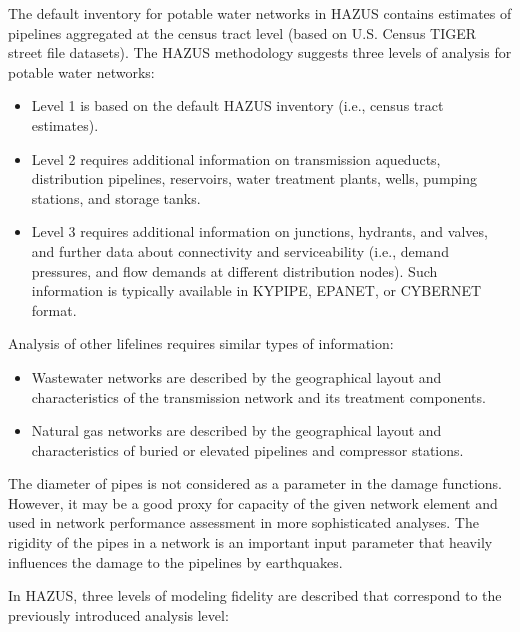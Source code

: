 The default inventory for potable water networks in HAZUS contains estimates of pipelines aggregated at the census tract level (based on U.S. Census TIGER street file datasets). The HAZUS methodology suggests three levels of analysis for potable water networks:

\begin{itemize}
    \item Level 1 is based on the default HAZUS inventory (i.e., census tract estimates).
    \item Level 2 requires additional information on transmission aqueducts, distribution pipelines, reservoirs, water treatment plants, wells, pumping stations, and storage tanks. 
    \item Level 3 requires additional information on junctions, hydrants, and valves, and further data about connectivity and serviceability (i.e., demand pressures, and flow demands at different distribution nodes). Such information is typically available in KYPIPE, EPANET, or CYBERNET format.
\end{itemize}

\noindent Analysis of other lifelines requires similar types of information:

\begin{itemize}
    \item Wastewater networks are described by the geographical layout and characteristics of the transmission network and its treatment components.
    \item Natural gas networks are described by the geographical layout and characteristics of buried or elevated pipelines and compressor stations.
\end{itemize}

The diameter of pipes is not considered as a parameter in the damage functions. However, it may be a good proxy for capacity of the given network element and used in network performance assessment in more sophisticated analyses. The rigidity of the pipes in a network is an important input parameter that heavily influences the damage to the pipelines by earthquakes. 

\noindent In HAZUS, three levels of modeling fidelity are described that correspond to the previously introduced analysis level: 

